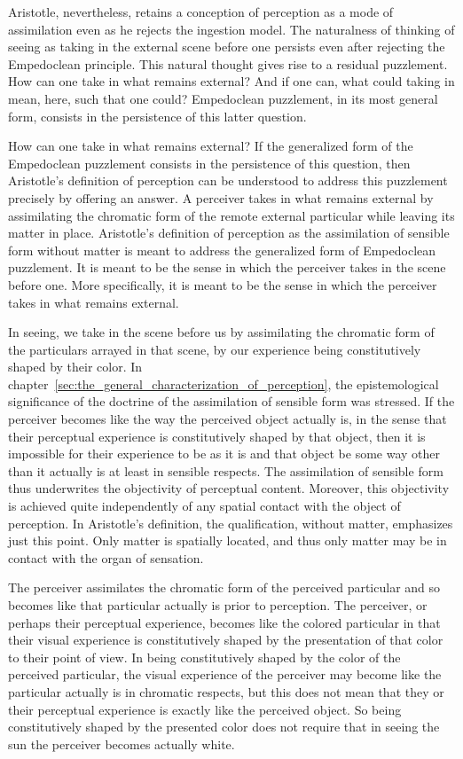 Aristotle, nevertheless, retains a conception of perception as a mode of assimilation even as he rejects the ingestion model. The naturalness of thinking of seeing as taking in the external scene before one persists even after rejecting the Empedoclean principle. This natural thought gives rise to a residual puzzlement. How can one take in what remains external? And if one can, what could taking in mean, here, such that one could? Empedoclean puzzlement, in its most general form, consists in the persistence of this latter question. 

How can one take in what remains external? If the generalized form of the Empedoclean puzzlement consists in the persistence of this question, then Aristotle's definition of perception can be understood to address this puzzlement precisely by offering an answer. A perceiver takes in what remains external by assimilating the chromatic form of the remote external particular while leaving its matter in place. Aristotle's definition of perception as the assimilation of sensible form without matter is meant to address the generalized form of Empedoclean puzzlement. It is meant to be the sense in which the perceiver takes in the scene before one. More specifically, it is meant to be the sense in which the perceiver takes in what remains external. 

In seeing, we take in the scene before us by assimilating the chromatic form of the particulars arrayed in that scene, by our experience being constitutively shaped by their color. In chapter~\ref{sec:the_general_characterization_of_perception}, the epistemological significance of the doctrine of the assimilation of sensible form was stressed. If the perceiver becomes like the way the perceived object actually is, in the sense that their perceptual experience is constitutively shaped by that object, then it is impossible for their experience to be as it is and that object be some way other than it actually is at least in sensible respects. The assimilation of sensible form thus underwrites the objectivity of perceptual content. Moreover, this objectivity is achieved quite independently of any spatial contact with the object of perception. In Aristotle's definition, the qualification, without matter, emphasizes just this point. Only matter is spatially located, and thus only matter may be in contact with the organ of sensation. 

The perceiver assimilates the chromatic form of the perceived particular and so becomes like that particular actually is prior to perception. The perceiver, or perhaps their perceptual experience, becomes like the colored particular in that their visual experience is constitutively shaped by the presentation of that color to their point of view. In being constitutively shaped by the color of the perceived particular, the visual experience of the perceiver may become like the particular actually is in chromatic respects, but this does not mean that they or their perceptual experience is exactly like the perceived object. So being constitutively shaped by the presented color does not require that in seeing the sun the perceiver becomes actually white.

